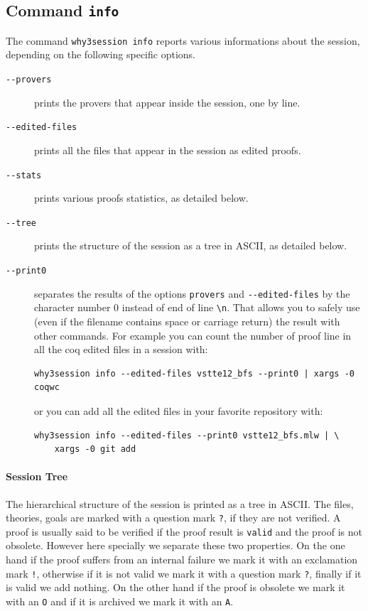 \subsection{Command \texttt{info}}

The command \texttt{why3session info} reports various informations
about the session, depending on the following specific options.
\begin{description}
\item[\texttt{-{}-provers}] prints the provers that appear inside
  the session, one by line.
\item[\texttt{-{}-edited-files}] prints all the files that appear in
  the session as edited proofs.
\item[\texttt{-{}-stats}] prints various proofs statistics, as
  detailed below.
\item[\texttt{-{}-tree}] prints the structure of the session as a
  tree in ASCII, as detailed below.
\item[\texttt{-{}-print0}] separates the results of the options
  \verb|provers| and \verb|--edited-files| by the character number 0
  instead of end of line \verb|\n|. That allows you to safely use
  (even if the filename contains space or carriage return) the result
  with other commands. For example you can count the number of proof
  line in all the coq edited files in a session with:
\begin{verbatim}
why3session info --edited-files vstte12_bfs --print0 | xargs -0 coqwc
\end{verbatim}
  or you can add all the edited files in your favorite repository
  with:
\begin{verbatim}
why3session info --edited-files --print0 vstte12_bfs.mlw | \
    xargs -0 git add
\end{verbatim}

\end{description}

\paragraph{Session Tree}

The hierarchical structure of the session is printed as a tree in
ASCII. The files, theories, goals are marked with a question mark
\verb|?|, if they are not verified. A proof is usually said to be
verified if the proof result is \verb|valid| and the proof is not
obsolete. However here specially we separate these two properties. On
the one hand if the proof suffers from an internal failure we mark it
with an exclamation mark \verb|!|, otherwise if it is not valid we
mark it with a question mark \verb|?|, finally if it is valid we add
nothing. On the other hand if the proof is obsolete we mark it with an
\verb|O| and if it is archived we mark it with an \verb|A|.

